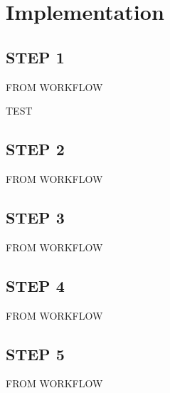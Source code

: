 \chapter{Implementation}
\section{STEP 1}

FROM WORKFLOW

TEST
\cite{DipPortal}

\section{STEP 2}

FROM WORKFLOW

\section{STEP 3}

FROM WORKFLOW

\section{STEP 4}

FROM WORKFLOW

\section{STEP 5}

FROM WORKFLOW